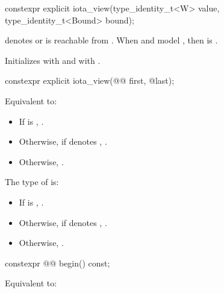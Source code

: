 %
\begin{itemdecl}
constexpr explicit iota_view(type_identity_t<W> value, type_identity_t<Bound> bound);
\end{itemdecl}

\begin{itemdescr}
\pnum
\expects
{} denotes  or
 is reachable from .
When  and  model ,
then  is .

\pnum
\effects
Initializes  with  and
 with .
\end{itemdescr}

%
\begin{itemdecl}
constexpr explicit iota_view(@@ first, @\seebelow@ last);
\end{itemdecl}

\begin{itemdescr}
\pnum
\effects
Equivalent to:
\begin{itemize}
\item
If  is ,
.
\item
Otherwise, if  denotes ,
.
\item
Otherwise, .
\end{itemize}

\pnum
\remarks
The type of  is:
\begin{itemize}
\item
If  is , .
\item
Otherwise, if  denotes ,
.
\item
Otherwise, .
\end{itemize}
\end{itemdescr}

%
\begin{itemdecl}
constexpr @@ begin() const;
\end{itemdecl}

\begin{itemdescr}
\pnum
\effects
Equivalent to: 
\end{itemdescr}

